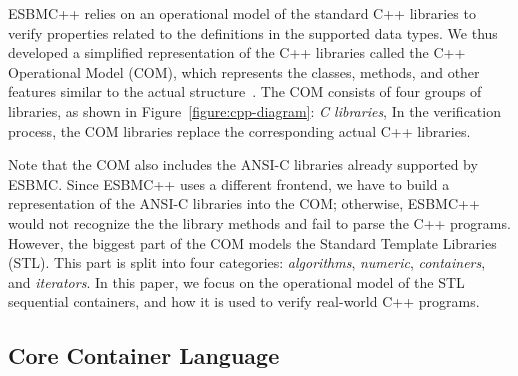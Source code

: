 \documentclass[a4paper]{llncs}
\begin{document}

ESBMC++ relies on an operational model of the standard C++ libraries to
verify properties related to the definitions in the supported data
types.  We thus developed a simplified representation of the C++
libraries called the C++ Operational Model (COM), which represents the
classes, methods, and other features similar to the actual
structure~\cite{CppReference12}.
The COM consists of four groups of libraries,
as shown in Figure~\ref{figure:cpp-diagram}: \emph{C libraries},
In the verification process, the COM libraries
replace the corresponding actual C++ libraries.

\begin{figure*}[ht] \centering
\caption{Overview of the operational model.}
\label{figure:cpp-diagram}
\end{figure*}


Note that the COM also includes the ANSI-C libraries already
supported by ESBMC.  Since ESBMC++ uses a different frontend, we have to build
a representation of the ANSI-C libraries into the COM; otherwise, ESBMC++ would
not recognize the the library methods and fail to parse the C++ programs.
%
However, the
biggest part of the COM models
the Standard Template Libraries (STL).
This part is split into
four categories: \textit{algorithms}, \textit{numeric},
\textit{containers}, and \textit{iterators}.
In this paper, we focus on the operational model of the
STL sequential containers,
and how it is used to
verify real-world C++ programs.

\subsection{Core Container Language}
\end{document}
